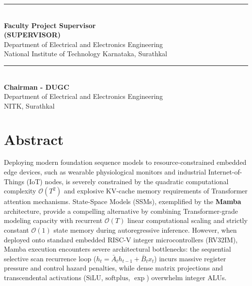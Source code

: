 \documentclass[11pt,a4paper,oneside]{report}
\begin{document}
\begin{mdframed}[linewidth=1.5pt]
\vspace{0.4cm}

\noindent \begin{minipage}{11cm}
\begin{flushleft}
\vspace{0.4cm}
\rule{5.5cm}{0.5pt}\\
\textbf{Faculty Project Supervisor}\\
\textbf{(SUPERVISOR)}\\
Department of Electrical and Electronics Engineering \\
National Institute of Technology Karnataka, Surathkal\\
\end{flushleft}
\end{minipage}

\vspace{1cm}

\begin{center}
\rule{5.5cm}{0.5pt}\\
\textbf{Chairman - DUGC}\\
Department of Electrical and Electronics Engineering\\
NITK, Surathkal
\end{center}
\thispagestyle{empty}
\end{mdframed}
\restoregeometry
\clearpage

\chapter*{Abstract}

Deploying modern foundation sequence models to resource-constrained embedded edge devices, such as wearable physiological monitors and industrial Internet-of-Things (IoT) nodes, is severely constrained by the quadratic computational complexity $\mathcal{O}(T^2)$ and explosive KV-cache memory requirements of Transformer attention mechanisms. State-Space Models (SSMs), exemplified by the \textbf{Mamba} architecture, provide a compelling alternative by combining Transformer-grade modeling capacity with recurrent $\mathcal{O}(T)$ linear computational scaling and strictly constant $\mathcal{O}(1)$ state memory during autoregressive inference. However, when deployed onto standard embedded RISC-V integer microcontrollers (RV32IM), Mamba execution encounters severe architectural bottlenecks: the sequential selective scan recurrence loop ($h_t = \bar{A}_t h_{t-1} + \bar{B}_t x_t$) incurs massive register pressure and control hazard penalties, while dense matrix projections and transcendental activations ($\text{SiLU}$, $\text{softplus}$, $\exp$) overwhelm integer ALUs.
\end{document}

